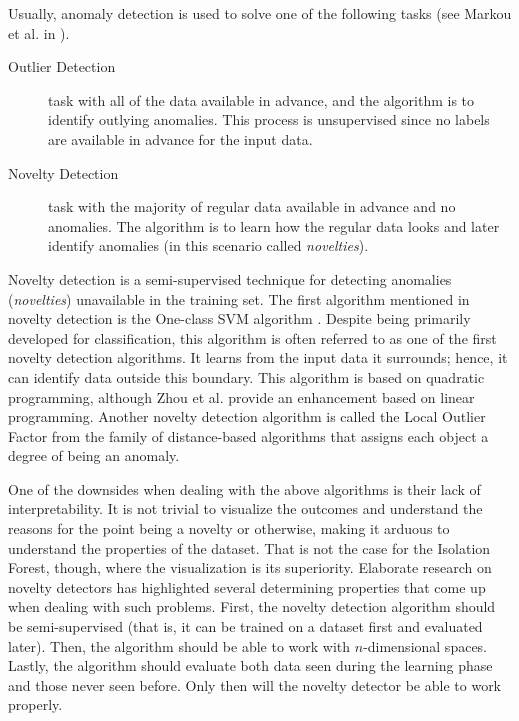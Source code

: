 
Usually, anomaly detection is used to solve one of the following tasks (see Markou et al. in \cite{MARKOU20032481}).
\begin{description}
    \item[Outlier Detection]  task with all of the data available in advance, and the algorithm is to identify outlying anomalies. This process is unsupervised since no labels are available in advance for the input data.
    \item[Novelty Detection]  task with the majority of regular data available in advance and no anomalies. The algorithm is to learn how the regular data looks and later identify anomalies (in this scenario called \emph{novelties}).
\end{description}

Novelty detection is a semi-supervised technique for detecting anomalies (\emph{novelties}) unavailable in the training set.
The first algorithm mentioned in novelty detection is the One-class SVM algorithm \cite{tax2004support}. Despite being primarily developed for classification, this algorithm is often referred to as one of the first novelty detection algorithms. It learns from the input data it surrounds; hence, it can identify data outside this boundary.
This algorithm is based on quadratic programming, although Zhou et al. \cite{ZHOU20022927} provide an enhancement based on linear programming.
Another novelty detection algorithm is called the Local Outlier Factor from the family of distance-based algorithms \cite{breunig2000lof} that assigns each object a degree of being an anomaly.



One of the downsides when dealing with the above algorithms is their lack of interpretability. It is not trivial to visualize the outcomes and understand the reasons for the point being a novelty or otherwise, making it arduous to understand the properties of the dataset. That is not the case for the Isolation Forest, though, where the visualization is its superiority.
Elaborate research on novelty detectors has highlighted several determining properties that come up when dealing with such problems. First, the novelty detection algorithm should be semi-supervised (that is, it can be trained on a dataset first and evaluated later). Then, the algorithm should be able to work with \(n\)-dimensional spaces. Lastly, the algorithm should evaluate both data seen during the learning phase and those never seen before. Only then will the novelty detector be able to work properly.

